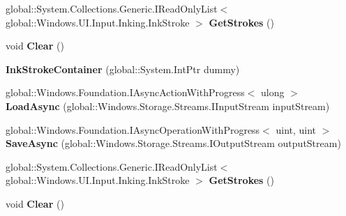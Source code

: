 \begin{DoxyCompactItemize}
global\+::\+System.\+Collections.\+Generic.\+I\+Read\+Only\+List$<$ global\+::\+Windows.\+U\+I.\+Input.\+Inking.\+Ink\+Stroke $>$ {\bfseries Get\+Strokes} ()
\item 
\mbox{\label{class_windows_1_1_u_i_1_1_input_1_1_inking_1_1_ink_stroke_container_a30539b293749d997f25488d7f6192d11}} 
void {\bfseries Clear} ()
\item 
\mbox{\label{class_windows_1_1_u_i_1_1_input_1_1_inking_1_1_ink_stroke_container_af018db7df39dc27906b9daad9fb6597c}} 
{\bfseries Ink\+Stroke\+Container} (global\+::\+System.\+Int\+Ptr dummy)
\item 
\mbox{\label{class_windows_1_1_u_i_1_1_input_1_1_inking_1_1_ink_stroke_container_a5616ede4fa36b0beea0b9be54c099ebb}} 
global\+::\+Windows.\+Foundation.\+I\+Async\+Action\+With\+Progress$<$ ulong $>$ {\bfseries Load\+Async} (global\+::\+Windows.\+Storage.\+Streams.\+I\+Input\+Stream input\+Stream)
\item 
\mbox{\label{class_windows_1_1_u_i_1_1_input_1_1_inking_1_1_ink_stroke_container_a40e4584e1273ad7c496cac055b5d57c9}} 
global\+::\+Windows.\+Foundation.\+I\+Async\+Operation\+With\+Progress$<$ uint, uint $>$ {\bfseries Save\+Async} (global\+::\+Windows.\+Storage.\+Streams.\+I\+Output\+Stream output\+Stream)
\item 
\mbox{\label{class_windows_1_1_u_i_1_1_input_1_1_inking_1_1_ink_stroke_container_af781d5c3e0bfb7e61a701f947102de1a}} 
global\+::\+System.\+Collections.\+Generic.\+I\+Read\+Only\+List$<$ global\+::\+Windows.\+U\+I.\+Input.\+Inking.\+Ink\+Stroke $>$ {\bfseries Get\+Strokes} ()
\item 
\mbox{\label{class_windows_1_1_u_i_1_1_input_1_1_inking_1_1_ink_stroke_container_a30539b293749d997f25488d7f6192d11}} 
void {\bfseries Clear} ()
\item 
\mbox{\label{class_windows_1_1_u_i_1_1_input_1_1_inking_1_1_ink_stroke_container_af018db7df39dc27906b9daad9fb6597c}} 

\end{DoxyCompactItemize}
